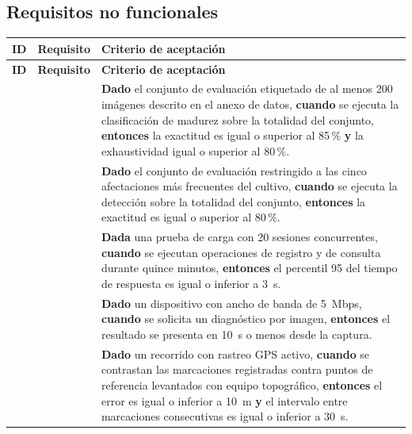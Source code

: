 \subsection*{Requisitos no funcionales}

\begin{longtable}{|C{1.5cm}|C{1.5cm}|L{12.4cm}|}
\hline
{}\textbf{ID} & \textbf{Requisito} & \textbf{Criterio de aceptación}\\ \hline
\endfirsthead
\hline
{}\textbf{ID} & \textbf{Requisito} & \textbf{Criterio de aceptación}\\ \hline
\endhead

 &  & \textbf{Dado} el conjunto de evaluación etiquetado de al menos 200 imágenes descrito en el anexo de datos, \textbf{cuando} se ejecuta la clasificación de madurez sobre la totalidad del conjunto, \textbf{entonces} la exactitud es igual o superior al 85\,\% \textbf{y} la exhaustividad igual o superior al 80\,\%. \\ \hline

 &  & \textbf{Dado} el conjunto de evaluación restringido a las cinco afectaciones más frecuentes del cultivo, \textbf{cuando} se ejecuta la detección sobre la totalidad del conjunto, \textbf{entonces} la exactitud es igual o superior al 80\,\%. \\ \hline

 &  & \textbf{Dada} una prueba de carga con 20 sesiones concurrentes, \textbf{cuando} se ejecutan operaciones de registro y de consulta durante quince minutos, \textbf{entonces} el percentil 95 del tiempo de respuesta es igual o inferior a 3~s. \\ \hline

 &  & \textbf{Dado} un dispositivo con ancho de banda de 5~Mbps, \textbf{cuando} se solicita un diagnóstico por imagen, \textbf{entonces} el resultado se presenta en 10~s o menos desde la captura. \\ \hline

 &  & \textbf{Dado} un recorrido con rastreo GPS activo, \textbf{cuando} se contrastan las marcaciones registradas contra puntos de referencia levantados con equipo topográfico, \textbf{entonces} el error es igual o inferior a 10~m \textbf{y} el intervalo entre marcaciones consecutivas es igual o inferior a 30~s. \\ \hline


\end{longtable}
